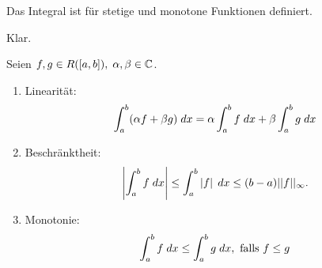 \documentclass[../ana2.tex]{subfiles}
\begin{document}
\begin{kor}
    Das Integral ist für stetige und monotone 
    Funktionen definiert.
\end{kor}
\begin{bew}
    Klar.
\end{bew}
\begin{satz}
    Seien \( f,g \in R([a,b]),\; \alpha, \beta \in \C \).
    \begin{enumerate}[label=(\alph*)]
        
        \item Linearität: \[ \integral{(\alpha f + \beta g)}{a}{b}
        = \alpha \integral{f}{a}{b} + \beta \integral{g}{a}{b} \]
        \item Beschränktheit: \[ \abs{\integral{f}{a}{b}} \leq 
        \integral{\abs{f}}{a}{b} 
        \leq (b-a)||f||_\infty. \]
        \item Monotonie: \[ \integral{f}{a}{b} 
        \leq \integral{g}{a}{b}, \text{ falls } f \leq g \]
    \end{enumerate}
\end{satz}
\end{document}
